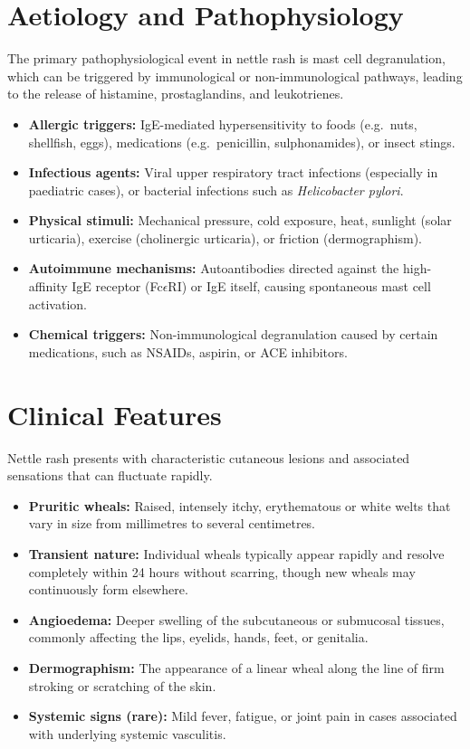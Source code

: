 \section*{Aetiology and Pathophysiology}
The primary pathophysiological event in nettle rash is mast cell degranulation, which can be triggered by immunological or non-immunological pathways, leading to the release of histamine, prostaglandins, and leukotrienes.
\begin{itemize}
    \item \textbf{Allergic triggers:} IgE-mediated hypersensitivity to foods (e.g.\ nuts, shellfish, eggs), medications (e.g.\ penicillin, sulphonamides), or insect stings.
    \item \textbf{Infectious agents:} Viral upper respiratory tract infections (especially in paediatric cases), or bacterial infections such as \textit{Helicobacter pylori}.
    \item \textbf{Physical stimuli:} Mechanical pressure, cold exposure, heat, sunlight (solar urticaria), exercise (cholinergic urticaria), or friction (dermographism).
    \item \textbf{Autoimmune mechanisms:} Autoantibodies directed against the high-affinity IgE receptor (Fc$\epsilon$RI) or IgE itself, causing spontaneous mast cell activation.
    \item \textbf{Chemical triggers:} Non-immunological degranulation caused by certain medications, such as NSAIDs, aspirin, or ACE inhibitors.
\end{itemize}

\section*{Clinical Features}
Nettle rash presents with characteristic cutaneous lesions and associated sensations that can fluctuate rapidly.
\begin{itemize}
    \item \textbf{Pruritic wheals:} Raised, intensely itchy, erythematous or white welts that vary in size from millimetres to several centimetres.
    \item \textbf{Transient nature:} Individual wheals typically appear rapidly and resolve completely within 24 hours without scarring, though new wheals may continuously form elsewhere.
    \item \textbf{Angioedema:} Deeper swelling of the subcutaneous or submucosal tissues, commonly affecting the lips, eyelids, hands, feet, or genitalia.
    \item \textbf{Dermographism:} The appearance of a linear wheal along the line of firm stroking or scratching of the skin.
    \item \textbf{Systemic signs (rare):} Mild fever, fatigue, or joint pain in cases associated with underlying systemic vasculitis.
\end{itemize}

